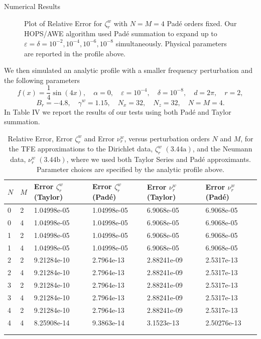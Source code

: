 \begin{section}{Numerical Results}
\begin{figure}[H]
\vspace{3mm}
\caption{Plot of Relative Error for $\zeta^w_r$ with $N=M=4$ Padé orders fixed. Our HOPS/AWE algorithm used Padé summation to expand up to $\varepsilon = \delta = 10^{-2}, 10^{-4},10^{-6},10^{-8}$ simultaneously. Physical parameters are reported in the profile above.}
\end{figure}
We then simulated an analytic profile with a smaller frequency perturbation and the following parameters
$$f(x)=\frac{1}{4}\sin(4x),\quad \alpha = 0, \quad \varepsilon = 10^{-4}, \quad \delta = 10^{-8}, \quad d=2\pi,\quad r=2,$$
$$B_r=-4.8,\quad \gamma^w = 1.15, \quad N_x = 32,\quad N_z=32, \quad N=M=4.$$
In Table IV we report the results of our tests using both Padé and Taylor summation.
\vspace{3mm}
\label{Second Numerical Tests Lower Layer}
\begin{longtable}[c]{llllll} \toprule
    {$N$} & {$M$} & {Error ${\zeta^w_r}$ (Taylor)} & {Error $\zeta^w_r$ (Padé)} & {Error $\nu^w_r$ (Taylor)} & {Error $\nu^w_r$ (Padé)}  \\ \midrule
0 & 2 & 1.04998e-05 & 1.04998e-05 & 6.9068e-05  & 6.9068e-05  \\
0 & 4 & 1.04998e-05 & 1.04998e-05 & 6.9068e-05  & 6.9068e-05  \\
1 & 2 & 1.04998e-05 & 1.04998e-05 & 6.9068e-05  & 6.9068e-05  \\
1 & 4 & 1.04998e-05 & 1.04998e-05 & 6.9068e-05  & 6.9068e-05  \\
2 & 2 & 9.21284e-10 & 2.7964e-13  & 2.88241e-09 & 2.5317e-13  \\
2 & 4 & 9.21284e-10 & 2.7964e-13  & 2.88241e-09 & 2.5317e-13  \\
3 & 2 & 9.21284e-10 & 2.7964e-13  & 2.88241e-09 & 2.5317e-13  \\
3 & 4 & 9.21284e-10 & 2.7964e-13  & 2.88241e-09 & 2.5317e-13  \\
4 & 2 & 9.21284e-10 & 2.7964e-13  & 2.88241e-09 & 2.5317e-13  \\
4 & 4 & 8.25908e-14 & 9.3863e-14  & 3.1523e-13  & 2.50276e-13 \\ \bottomrule
\\
\caption{Relative Error, Error ${\zeta^w_r}$ and Error $\nu^w_r$, versus perturbation orders $N$ and $M$, for the TFE approximations to the Dirichlet data, $\zeta^w_r$ $(3.44\text{a})$, and the Neumann data, $\nu^w_r$ $(3.44\text{b})$, where we used both Taylor Series and Padé approximants. Parameter choices are specified by the analytic profile above.}

\end{longtable}
\end{section}
